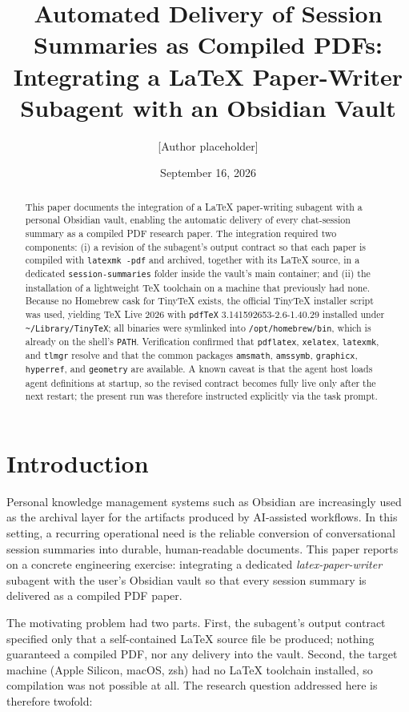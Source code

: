 \documentclass[11pt]{article}
\title{Automated Delivery of Session Summaries as Compiled PDFs:\\ Integrating a LaTeX Paper-Writer Subagent with an Obsidian Vault}
\author{[Author placeholder]}
\date{September 16, 2026}
\begin{document}
\maketitle

\begin{abstract}
This paper documents the integration of a LaTeX paper-writing subagent with a personal Obsidian vault, enabling the automatic delivery of every chat-session summary as a compiled PDF research paper. The integration required two components: (i) a revision of the subagent's output contract so that each paper is compiled with \texttt{latexmk -pdf} and archived, together with its \LaTeX{} source, in a dedicated \texttt{session-summaries} folder inside the vault's main container; and (ii) the installation of a lightweight \TeX{} toolchain on a machine that previously had none. Because no Homebrew cask for TinyTeX exists, the official TinyTeX installer script was used, yielding TeX Live 2026 with \texttt{pdfTeX} 3.141592653-2.6-1.40.29 installed under \texttt{\textasciitilde/Library/TinyTeX}; all binaries were symlinked into \texttt{/opt/homebrew/bin}, which is already on the shell's \texttt{PATH}. Verification confirmed that \texttt{pdflatex}, \texttt{xelatex}, \texttt{latexmk}, and \texttt{tlmgr} resolve and that the common packages \texttt{amsmath}, \texttt{amssymb}, \texttt{graphicx}, \texttt{hyperref}, and \texttt{geometry} are available. A known caveat is that the agent host loads agent definitions at startup, so the revised contract becomes fully live only after the next restart; the present run was therefore instructed explicitly via the task prompt.
\end{abstract}

\section{Introduction}
\label{sec:intro}

Personal knowledge management systems such as Obsidian are increasingly used as the archival layer for the artifacts produced by AI-assisted workflows. In this setting, a recurring operational need is the reliable conversion of conversational session summaries into durable, human-readable documents. This paper reports on a concrete engineering exercise: integrating a dedicated \emph{latex-paper-writer} subagent with the user's Obsidian vault so that every session summary is delivered as a compiled PDF paper.

The motivating problem had two parts. First, the subagent's output contract specified only that a self-contained \LaTeX{} source file be produced; nothing guaranteed a compiled PDF, nor any delivery into the vault. Second, the target machine (Apple Silicon, macOS, zsh) had no \LaTeX{} toolchain installed, so compilation was not possible at all. The research question addressed here is therefore twofold:
\end{document}
